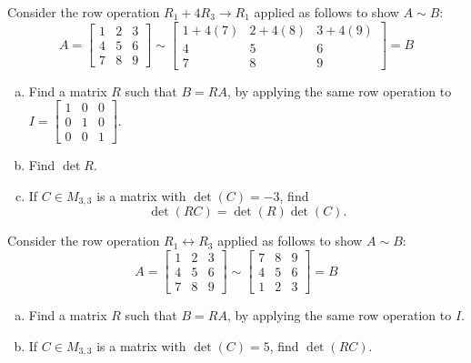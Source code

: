 \begin{applicationActivities}
\begin{activity}{5}
Consider the row operation \(R_1+4R_3\to R_1\) applied as follows to show
\(A\sim B\):
\[
A=\begin{bmatrix}1&2&3\\4&5&6\\7&8&9\end{bmatrix}
  \sim
\begin{bmatrix}1+4(7)&2+4(8)&3+4(9)\\4&5&6\\7&8&9\end{bmatrix}=B
\]
\begin{enumerate}[(a)]
\item Find a matrix \(R\) such that \(B=RA\), by applying the same row operation to 
\(I=\begin{bmatrix}1&0&0\\0&1&0\\0&0&1\end{bmatrix}\).
\item Find \(\det R\).
\item If \(C \in M_{3,3}\) is a matrix with \(\det(C)= -3\), find 
\[\det(RC)=\det(R)\det(C).\]
\end{enumerate}
\end{activity}

\begin{activity}{5}
Consider the row operation \(R_1\leftrightarrow R_3\) applied as follows to show
\(A\sim B\):
\[
A=\begin{bmatrix}1&2&3\\4&5&6\\7&8&9\end{bmatrix}
  \sim
\begin{bmatrix}7&8&9\\4&5&6\\1&2&3\end{bmatrix}=B
\]
\begin{enumerate}[(a)]
\item Find a matrix \(R\) such that \(B=RA\), by applying the same row operation to \(I\).
\item If \(C \in M_{3,3}\) is a matrix with \(\det(C)= 5\), find \(\det(RC)\).
\end{enumerate}
\end{activity}


\end{applicationActivities}
